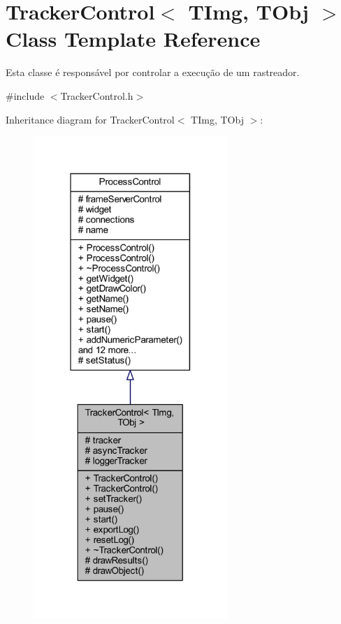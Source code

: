 \hypertarget{class_tracker_control}{}\section{Tracker\+Control$<$ T\+Img, T\+Obj $>$ Class Template Reference}
\label{class_tracker_control}


Esta classe é responsável por controlar a execução de um rastreador.  




{\ttfamily \#include $<$Tracker\+Control.\+h$>$}



Inheritance diagram for Tracker\+Control$<$ T\+Img, T\+Obj $>$\+:
\nopagebreak
\begin{figure}[H]
\begin{center}
\leavevmode
\includegraphics[width=208pt]{class_tracker_control__inherit__graph}
\end{center}
\end{figure}


